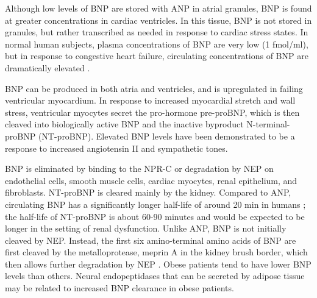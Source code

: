 \documentclass[14pt,a4paper,onecolumn]{extarticle}
\begin{document}

Although low levels of BNP are stored with ANP in atrial granules, BNP is found at greater concentrations in cardiac ventricles. In this tissue, BNP is not stored in granules, but rather transcribed as needed in response to cardiac stress states. \citep{Grepin1994} \citep{Thuerauf1994} In normal human subjects, plasma concentrations of BNP are very low (1 fmol/ml), but in response to congestive heart failure, circulating concentrations of BNP are dramatically elevated \citep{Mukoyama1991} \citep{Mukoyama1990}.

BNP can be produced in both atria and ventricles, and is upregulated in failing ventricular myocardium. In response to increased myocardial stretch and wall stress, ventricular myocytes secret the pro-hormone pre-proBNP, which is then cleaved into biologically active BNP and the inactive byproduct N-terminal-proBNP (NT-proBNP). Elevated BNP levels have been demonstrated to be a response to increased angiotensin II and sympathetic tones. \citep{Iwanaga2006}


BNP is eliminated by binding to the NPR-C or degradation by NEP on endothelial cells, smooth muscle cells, cardiac myocytes, renal epithelium, and fibroblasts. NT-proBNP is cleared mainly by the kidney.\citep{Schrier1999}  Compared to ANP, circulating BNP has a significantly longer half-life of around 20 min in humans \citep{Mukoyama1991} \citep{Mukoyama1990}; the half-life of NT-proBNP is about 60-90 minutes and would be expected to be longer in the setting of renal dysfunction. Unlike ANP, BNP is not initially cleaved by NEP. Instead, the first six amino-terminal amino acids of BNP are first cleaved by the metalloprotease, meprin A in the kidney brush border, which then allows further degradation by NEP \citep{Pankow2007}. Obese patients tend to have lower BNP levels than others. Neural endopeptidases that can be secreted by adipose tissue may be related to increased BNP clearance in obese patients.\citep{Yang2004}
\end{document}
